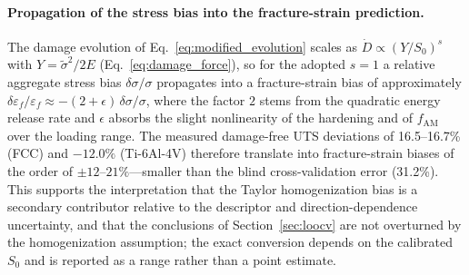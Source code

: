 \documentclass[twocolumn]{sagej}
\begin{document}
\paragraph{Propagation of the stress bias into the fracture-strain prediction.} The damage evolution of Eq.~\eqref{eq:modified_evolution} scales as $\dot{D} \propto (Y/S_0)^s$ with $Y = \tilde{\sigma}^2/2E$ (Eq.~\eqref{eq:damage_force}), so for the adopted $s=1$ a relative aggregate stress bias $\delta\sigma/\sigma$ propagates into a fracture-strain bias of approximately $\delta\varepsilon_f/\varepsilon_f \approx -(2+\epsilon)\,\delta\sigma/\sigma$, where the factor $2$ stems from the quadratic energy release rate and $\epsilon$ absorbs the slight nonlinearity of the hardening and of $f_{\mathrm{AM}}$ over the loading range. The measured damage-free UTS deviations of 16.5--16.7\% (FCC) and $-12.0\%$ (Ti-6Al-4V) therefore translate into fracture-strain biases of the order of $\pm 12$--$21\%$---smaller than the blind cross-validation error (31.2\%). This supports the interpretation that the Taylor homogenization bias is a secondary contributor relative to the descriptor and direction-dependence uncertainty, and that the conclusions of Section~\ref{sec:loocv} are not overturned by the homogenization assumption; the exact conversion depends on the calibrated $S_0$ and is reported as a range rather than a point estimate.
\end{document}
